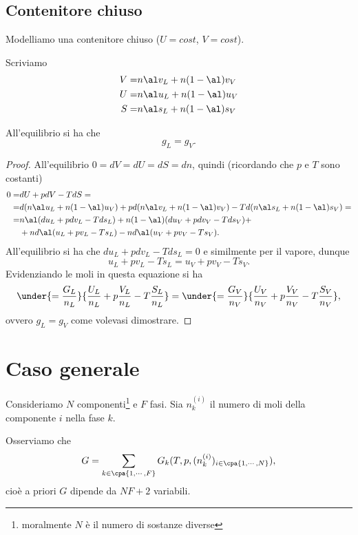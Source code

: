 \subsection{Contenitore chiuso}
Modelliamo una contenitore chiuso ($U=cost$, $V=cost$).
\begin{notation}
Scriviamo
\begin{align*}
V=&n\al v_L+n(1-\al)v_V\\
U=&n\al u_L+n(1-\al)u_V\\
S=&n\al s_L+n(1-\al)s_V
\end{align*}
\end{notation}
\begin{proposition}
All'equilibrio si ha che
\[g_L=g_V.\]
\end{proposition}
\begin{proof}
All'equilibrio $0=dV=dU=dS=dn$, quindi (ricordando che $p$ e $T$ sono costanti)
\begin{align*}
0=&dU+pdV-TdS=\\
=&d(n\al u_L+n(1-\al)u_V)+pd(n\al v_L+n(1-\al)v_V)-Td(n\al s_L+n(1-\al)s_V)=\\
=&n\al (du_L+pdv_L-Tds_L)+n(1-\al)(du_V+pdv_V-Tds_V)+\\
&+nd\al (u_L+pv_L-Ts_L)-nd\al (u_V+pv_V-Ts_V).
\end{align*}
All'equilibrio si ha che $du_L+pdv_L-Tds_L=0$ e similmente per il vapore, dunque
\[u_L+pv_L-Ts_L=u_V+pv_V-Ts_V.\]
Evidenziando le moli in questa equazione si ha
\[\under{=\frac{G_L}{n_L}}{\frac{U_L}{n_L}+p\frac{V_L}{n_L}-T\frac{S_L}{n_L}}=\under{=\frac{G_V}{n_V}}{\frac{U_V}{n_V}+p\frac{V_V}{n_V}-T\frac{S_V}{n_V}},\]
ovvero $g_L=g_V$ come volevasi dimostrare.
\end{proof}


\section{Caso generale}
Consideriamo $N$ componenti\footnote{moralmente $N$ \`e il numero di sostanze diverse} e $F$ fasi. Sia $n^{(i)}_k$ il numero di moli della componente $i$ nella fase $k$.\medskip

\noindent
Osserviamo che
\[G=\sum_{k\in\cpa{1,\cdots, F}}G_k(T,p,(n_k^{(i)})_{i\in\cpa{1,\cdots, N}}),\]
cio\`e a priori $G$ dipende da $NF+2$ variabili.

